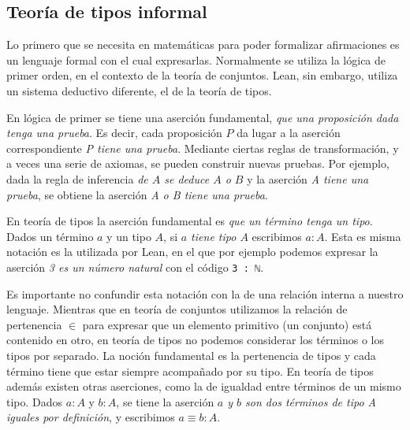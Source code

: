 


\subsection{Teoría de tipos informal}

Lo primero que se necesita en matemáticas para poder formalizar afirmaciones es
un lenguaje formal con el cual expresarlas. Normalmente se utiliza la lógica de
primer orden, en el contexto de la teoría de conjuntos. Lean, sin embargo,
utiliza un sistema deductivo diferente, el de la teoría de tipos.

En lógica de primer se tiene una aserción fundamental, \textit{que una
	proposición dada tenga una prueba}. Es decir, cada proposición $P$ da lugar a la
aserción correspondiente \textit{P tiene una prueba}. Mediante ciertas reglas de
transformación, y a veces una serie de axiomas, se pueden construir nuevas
pruebas. Por ejemplo, dada la regla de inferencia \textit{de $A$ se deduce $A$ o
	$B$} y la aserción \textit{A tiene una prueba}, se obtiene la aserción \textit{A
	o B tiene una prueba}.

En teoría de tipos la aserción fundamental es \textit{que un término tenga un
	tipo}. Dados un término $a$ y un tipo $A$, si \textit{$a$ tiene tipo $A$}
escribimos $a:A$. Esta es misma notación es la utilizada por Lean, en el que por
ejemplo podemos expresar la aserción \textit{3 es un número natural} con el
código \lstinline{3 : ℕ}.

Es importante no confundir esta notación con la de una
relación interna a nuestro lenguaje. Mientras que en teoría de conjuntos
utilizamos la relación de pertenencia $\in$ para expresar que un elemento
primitivo (un conjunto) está contenido en otro, en teoría de tipos no podemos
considerar los términos o los tipos por separado. La noción fundamental es la
pertenencia de tipos y cada término tiene que estar siempre acompañado por su
tipo. En teoría de tipos además existen otras aserciones, como la de igualdad
entre términos de un mismo tipo. Dados $a:A$ y $b:A$, se tiene la aserción
\textit{$a$ y $b$ son dos términos de tipo A iguales por definición}, y
escribimos $a\equiv b : A$.

